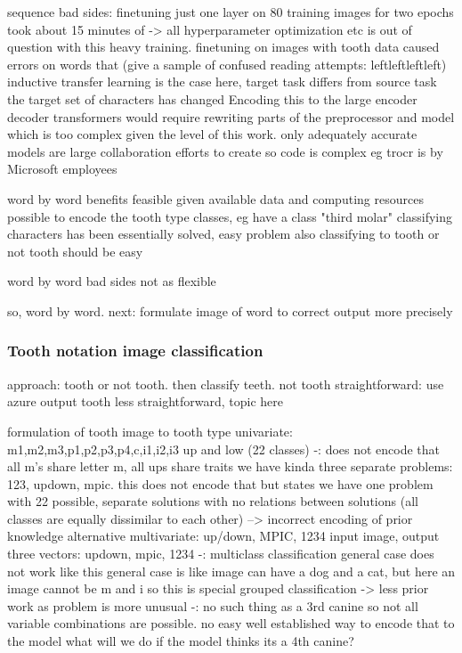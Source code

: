 \documentclass{article}
\begin{document}
sequence bad sides:
    finetuning just one layer on 80 training images for two epochs took about 15 minutes of \cite{li2021trocr}
        -> all hyperparameter optimization etc is out of question with this heavy training.
    finetuning on images with tooth data caused errors on words that 
        (give a sample of confused reading attempts: leftleftleftleft)
    inductive transfer learning is the case here, target task differs from source task
        the target set of characters has changed
            Encoding this to the large encoder decoder transformers would 
            require rewriting parts of the preprocessor and model which is too complex given the level of this work.
                only adequately accurate models are large collaboration efforts to create so code is complex 
                eg trocr is by Microsoft employees

word by word benefits
feasible given available data and computing resources
possible to encode the tooth type classes, eg have a class "third molar"
classifying characters has been essentially solved, easy problem 
also classifying to tooth or not tooth should be easy 

word by word bad sides
    not as flexible

so, word by word. next: formulate image of word to correct output more precisely

\subsubsection{Tooth notation image classification}

approach: tooth or not tooth. then classify teeth. 
not tooth straightforward: use azure output
tooth less straightforward, topic here

formulation of tooth image to tooth type
    univariate: m1,m2,m3,p1,p2,p3,p4,c,i1,i2,i3 up and low (22 classes)
        -: does not encode that all m's share letter m, all ups share traits
        we have kinda three separate problems: 123, updown, mpic. this does not encode that 
        but states we have one problem with 22 possible, separate solutions with no relations between solutions
            (all classes are equally dissimilar to each other) --> incorrect encoding of prior knowledge
    alternative multivariate: up/down, MPIC, 1234
        input image, output three vectors: updown, mpic, 1234
            -: multiclass classification general case does not work like this 
                general case is like image can have a dog and a cat, but here an image cannot be m and i \cite{multilabel_classification}
                    so this is special grouped classification -> less prior work as problem is more unusual 
            -: no such thing as a 3rd canine 
                so not all variable combinations are possible. no easy well established way to encode that to the model 
                    what will we do if the model thinks its a 4th canine?
\end{document}
